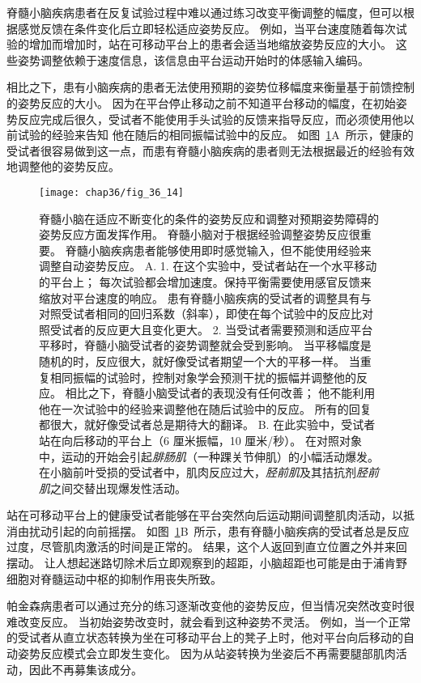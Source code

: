 脊髓小脑疾病患者在反复试验过程中难以通过练习改变平衡调整的幅度，但可以根据感觉反馈在条件变化后立即轻松适应姿势反应。
例如，当平台速度随着每次试验的增加而增加时，站在可移动平台上的患者会适当地缩放姿势反应的大小。
这些姿势调整依赖于速度信息，该信息由平台运动开始时的体感输入编码。


相比之下，患有小脑疾病的患者无法使用预期的姿势位移幅度来衡量基于前馈控制的姿势反应的大小。
因为在平台停止移动之前不知道平台移动的幅度，在初始姿势反应完成后很久，受试者不能使用手头试验的反馈来指导反应，而必须使用他以前试验的经验来告知 他在随后的相同振幅试验中的反应。
如图~\ref{fig:36_14}A~所示，健康的受试者很容易做到这一点，而患有脊髓小脑疾病的患者则无法根据最近的经验有效地调整他的姿势反应。


\begin{figure}[htbp]
	\centering
	\texttt{[image: chap36/fig\_36\_14]}
	\caption{脊髓小脑在适应不断变化的条件的姿势反应和调整对预期姿势障碍的姿势反应方面发挥作用。
		脊髓小脑对于根据经验调整姿势反应很重要。
		脊髓小脑疾病患者能够使用即时感觉输入，但不能使用经验来调整自动姿势反应\cite{horak1994cerebellar}。
		A. 1. 在这个实验中，受试者站在一个水平移动的平台上；
		每次试验都会增加速度。保持平衡需要使用感官反馈来缩放对平台速度的响应。
		患有脊髓小脑疾病的受试者的调整具有与对照受试者相同的回归系数（斜率），即使在每个试验中的反应比对照受试者的反应更大且变化更大。
		2. 当受试者需要预测和适应平台平移时，脊髓小脑受试者的姿势调整就会受到影响。
		当平移幅度是随机的时，反应很大，就好像受试者期望一个大的平移一样。
		当重复相同振幅的试验时，控制对象学会预测干扰的振幅并调整他的反应。
		相比之下，脊髓小脑受试者的表现没有任何改善；
		他不能利用他在一次试验中的经验来调整他在随后试验中的反应。
		所有的回复都很大，就好像受试者总是期待大的翻译。
		B. 在此实验中，受试者站在向后移动的平台上（6 厘米振幅，10 厘米/秒）。
		在对照对象中，运动的开始会引起\textit{腓肠肌}（一种踝关节伸肌）的小幅活动爆发。
		在小脑前叶受损的受试者中，肌肉反应过大，\textit{胫前肌}及其拮抗剂\textit{胫前肌}之间交替出现爆发性活动。}
	\label{fig:36_14}
\end{figure}


站在可移动平台上的健康受试者能够在平台突然向后运动期间调整肌肉活动，以抵消由扰动引起的向前摇摆。
如图~\ref{fig:36_14}B~所示，患有脊髓小脑疾病的受试者总是反应过度，尽管肌肉激活的时间是正常的。
结果，这个人返回到直立位置之外并来回摆动。
让人想起迷路切除术后立即观察到的超距，小脑超距也可能是由于浦肯野细胞对脊髓运动中枢的抑制作用丧失所致。


帕金森病患者可以通过充分的练习逐渐改变他的姿势反应，但当情况突然改变时很难改变反应。
当初始姿势改变时，就会看到这种姿势不灵活。
例如，当一个正常的受试者从直立状态转换为坐在可移动平台上的凳子上时，他对平台向后移动的自动姿势反应模式会立即发生变化。
因为从站姿转换为坐姿后不再需要腿部肌肉活动，因此不再募集该成分。



